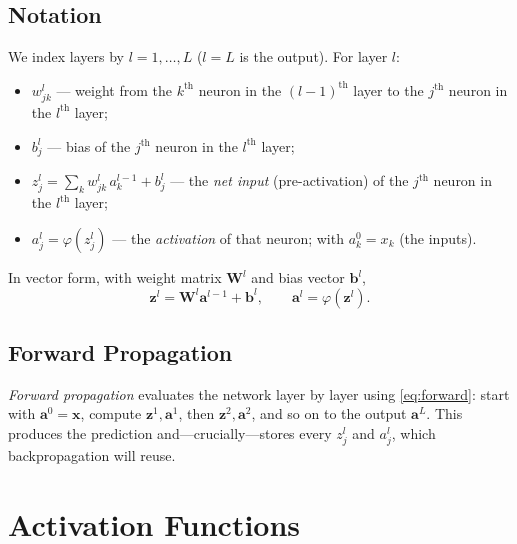 \documentclass[11pt,a4paper]{report}
\theoremstyle{definition}
\theoremstyle{remark}
\newcommand{\vx}{\mathbf{x}}
\newcommand{\vb}{\mathbf{b}}
\newcommand{\vz}{\mathbf{z}}
\newcommand{\va}{\mathbf{a}}
\newcommand{\W}{\mathbf{W}}
\begin{document}
\section{Notation}
We index layers by $l=1,\dots,L$ ($l=L$ is the output). For layer $l$:
\begin{itemize}[nosep]
  \item $w^{l}_{jk}$ --- weight from the $k^{\text{th}}$ neuron in the
        $(l-1)^{\text{th}}$ layer to the $j^{\text{th}}$ neuron in the
        $l^{\text{th}}$ layer;
  \item $b^{l}_{j}$ --- bias of the $j^{\text{th}}$ neuron in the
        $l^{\text{th}}$ layer;
  \item $z^{l}_{j}=\sum_k w^{l}_{jk}\,a^{l-1}_{k}+b^{l}_{j}$ --- the
        \emph{net input} (pre-activation) of the $j^{\text{th}}$ neuron in the
        $l^{\text{th}}$ layer;
  \item $a^{l}_{j}=\varphi\!\left(z^{l}_{j}\right)$ --- the \emph{activation} of
        that neuron; with $a^{0}_{k}=x_k$ (the inputs).
\end{itemize}
In vector form, with weight matrix $\W^{l}$ and bias vector $\vb^{l}$,
\begin{equation}
\vz^{l}=\W^{l}\va^{l-1}+\vb^{l},\qquad \va^{l}=\varphi(\vz^{l}).
\label{eq:forward}
\end{equation}

\section{Forward Propagation}
\emph{Forward propagation} evaluates the network layer by layer using
\eqref{eq:forward}: start with $\va^{0}=\vx$, compute $\vz^{1},\va^{1}$, then
$\vz^{2},\va^{2}$, and so on to the output $\va^{L}$. This produces the
prediction and---crucially---stores every $z^l_j$ and $a^l_j$, which
backpropagation will reuse.

\chapter{Activation Functions}
\end{document}
